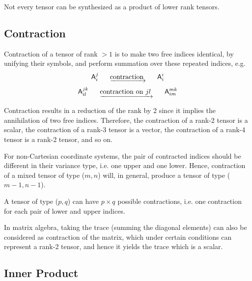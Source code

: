  Not every tensor can be synthesized as a product of lower
rank tensors.



\subsection{Contraction\label{subsubContraction}}

 Contraction of a tensor of rank $>1$ is to make two free
indices identical, by unifying their symbols, and perform summation
over these repeated indices, e.g.
\begin{equation}
\mathsf{A}_{i}^{j}\,\,\,\,\,\,\,\,\,\,\underrightarrow{\mathrm{contraction\,\,}}\,\,\,\,\,\,\,\,\,\,\mathsf{A}_{i}^{i}
\end{equation}
\begin{equation}
\mathsf{A}_{il}^{jk}\,\,\,\,\,\,\,\,\,\,\underrightarrow{\mathrm{contraction\,\,on}\,\,jl\,\,}\,\,\,\,\,\,\,\,\,\,\mathsf{A}_{im}^{mk}
\end{equation}


 Contraction results in a reduction of the rank by 2 since
it implies the annihilation of two free indices. Therefore, the contraction
of a rank-2 tensor is a scalar, the contraction of a rank-3 tensor
is a vector, the contraction of a rank-4 tensor is a rank-2 tensor,
and so on.

 For  non-Cartesian coordinate systems, the pair
of contracted indices should be different in their variance type,
i.e. one upper and one lower. Hence, contraction of a mixed tensor
of type ($m,n$) will, in general, produce a tensor of type ($m-1,n-1$).

 A tensor of type ($p,q$) can have $p\times q$ possible
contractions, i.e. one contraction for each pair of lower and upper
indices.




 \begin{exa}[Trace]
   In matrix algebra, taking the trace (summing the diagonal
elements) can also be considered as contraction of the matrix, which
under certain conditions can represent a rank-2 tensor, and hence
it yields the trace which is a scalar.

 \end{exa}




\subsection{Inner Product\label{secInnerProduct}}

